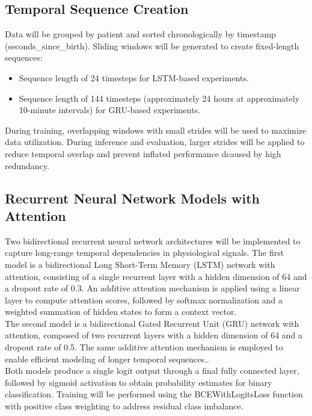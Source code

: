 \documentclass[conference]{IEEEtran}
\begin{document}
\subsection{Temporal Sequence Creation} 

Data will be grouped by patient and sorted chronologically by timestamp (seconds\_since\_birth). Sliding windows will be generated to create fixed-length sequences:
\begin{itemize}
    \item Sequence length of 24 timesteps for LSTM-based experiments.
    \item Sequence length of 144 timesteps (approximately 24 hours at approximately 10-minute intervals) for GRU-based experiments.
\end{itemize}
During training, overlapping windows with small strides will be used to maximize data utilization. During inference and evaluation, larger strides will be applied to reduce temporal overlap and prevent inflated performance dcaused by high redundancy.


\subsection{Recurrent Neural Network Models with Attention}

Two bidirectional recurrent neural network architectures will be implemented to capture long-range temporal dependencies in physiological signals. The first model is a bidirectional Long Short-Term Memory (LSTM) network with attention, consisting of a single recurrent layer with a hidden dimension of 64 and a dropout rate of 0.3. An additive attention mechanism is applied using a linear layer to compute attention scores, followed by softmax normalization and a weighted summation of hidden states to form a context vector.\\

The second model is a bidirectional Gated Recurrent Unit (GRU) network with attention, composed of two recurrent layers with a hidden dimension of 64 and a dropout rate of 0.5. The same additive attention mechanism is employed to enable efficient modeling of longer temporal sequences..\\

Both models produce a single logit output through a final fully connected layer, followed by sigmoid activation to obtain probability estimates for binary classification. Training will be performed using the BCEWithLogitsLoss function with positive class weighting to address residual class imbalance.
\end{document}
